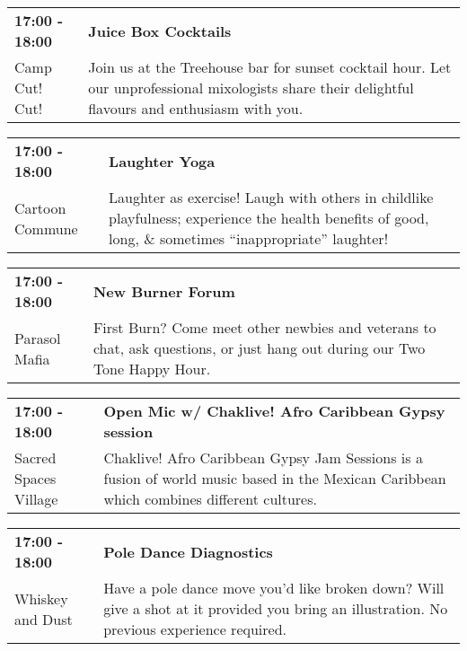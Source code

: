 \begin{tabular}{ p{1in} p{2.2in} }
    \textbf{17:00 - 18:00} & \textbf{Juice Box Cocktails} \\
    Camp Cut! Cut! \newline  & Join us at the Treehouse bar for sunset cocktail hour. Let our unprofessional mixologists share their  delightful flavours and enthusiasm with you. \\
    \hline 
\end{tabular}
    
\begin{tabular}{ p{1in} p{2.2in} }
    \textbf{17:00 - 18:00} & \textbf{Laughter Yoga} \\
    Cartoon Commune \newline  & Laughter as exercise! Laugh with others in childlike playfulness; experience the health benefits of good, long, \& sometimes ``inappropriate'' laughter! \\
    \hline 
\end{tabular}
    
\begin{tabular}{ p{1in} p{2.2in} }
    \textbf{17:00 - 18:00} & \textbf{New Burner Forum} \\
    Parasol Mafia \newline  & First Burn? Come meet other newbies and veterans to chat, ask questions, or just hang out during our Two Tone Happy Hour. \\
    \hline 
\end{tabular}
    
\begin{tabular}{ p{1in} p{2.2in} }
    \textbf{17:00 - 18:00} & \textbf{Open Mic w/ Chaklive! Afro Caribbean Gypsy session} \\
    Sacred Spaces Village \newline  & Chaklive! Afro Caribbean Gypsy Jam Sessions is a fusion of world music based in the Mexican Caribbean which combines different cultures. \\
    \hline 
\end{tabular}
    
\begin{tabular}{ p{1in} p{2.2in} }
    \textbf{17:00 - 18:00} & \textbf{Pole Dance Diagnostics} \\
    Whiskey and Dust \newline  & Have a pole dance move you'd like broken down? Will give a shot at it provided you bring an illustration. No previous experience required. \\
    \hline 
\end{tabular}
    
